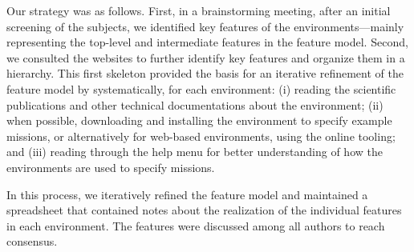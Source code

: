 Our strategy was as follows.
First, in a brainstorming meeting, after an initial screening of the subjects, we identified key features of the environments---mainly representing the top-level and intermediate features in the feature model. Second, we consulted the websites to further identify key features and organize them in a hierarchy. This first skeleton provided the basis for an iterative refinement of the feature model by systematically, for each environment: (i) reading the scientific publications and other technical documentations about the environment; (ii) when possible, downloading and installing the environment to specify example missions, or alternatively for web-based environments, using the online tooling; and (iii) reading through the help menu for better understanding of how the environments are used to specify missions.

In this process, we iteratively refined the feature model and maintained a spreadsheet that contained notes about the realization of the individual features in each environment. The features were discussed among all authors to reach consensus.


%
%
%

